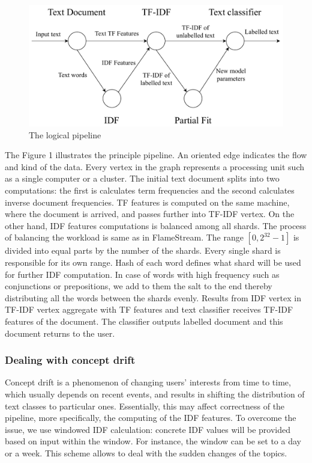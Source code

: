 \begin{figure}[htbp]
  \centering
  \includegraphics[scale=0.48]{pics/logical-graph}
  \caption{The logical pipeline}
  \label {logical graph}
\end{figure}

The Figure 1 illustrates the principle pipeline. An oriented edge indicates the flow and kind of the data. Every vertex in the graph represents a processing unit such as a single computer or a cluster. The initial text document splits into two computations: the first is calculates term frequencies and the second calculates inverse document frequencies. TF features is computed on the same machine, where the document is arrived, and passes further into TF-IDF vertex. On the other hand, IDF features computations is balanced among all shards. The process of balancing the workload is same as in FlameStream. The range $[0, 2^{32} - 1]$ is divided into equal parts by the number of the shards. Every single shard is responsible for its own range. Hash of each word defines what shard will be used for further IDF computation. In case of words with high frequency such as conjunctions or prepositions, we add to them the salt to the end thereby distributing all the words between the shards evenly. Results from IDF vertex in TF-IDF vertex aggregate with TF features and text classifier receives TF-IDF features of the document. The classifier outputs labelled document and this document returns to the user.

\subsubsection{Dealing with concept drift}

Concept drift is a phenomenon of changing users' interests from time to time, which usually depends on recent events, and results in shifting the distribution of text classes to particular ones. Essentially, this may affect correctness of the pipeline, more specifically, the computing of the IDF features. To overcome the issue, we use windowed IDF calculation: concrete IDF values will be provided based on input within the window. For instance, the window can be set to a day or a week. This scheme allows to deal with the sudden changes of the topics.

